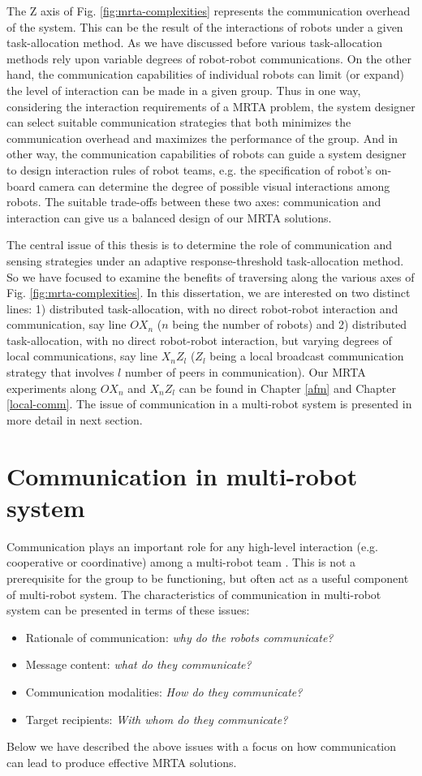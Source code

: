 The Z axis of Fig. \ref{fig:mrta-complexities} represents the communication overhead of the system. This can be the result of the interactions  of robots under a given task-allocation method. As we have discussed before various task-allocation methods rely upon variable degrees of robot-robot communications.  On the other hand, the communication capabilities of individual robots can limit (or expand) the level of interaction can be made  in a given group. Thus in one way, considering the interaction requirements of a MRTA problem, the system designer can  select suitable communication strategies that both minimizes the communication overhead and maximizes the performance of the group. And in other way, the communication capabilities of robots can guide a system designer to design interaction rules of robot teams, e.g. the specification of robot's on-board camera  can determine the degree of possible visual interactions among robots. The suitable trade-offs between these two axes: communication and interaction can give us a balanced design of our MRTA solutions.

The central issue of this thesis is to determine the role of communication and sensing strategies under an adaptive response-threshold task-allocation method. So we have focused to examine the benefits of traversing along the various axes of Fig. \ref{fig:mrta-complexities}. In this dissertation, we are interested on two distinct lines: 1) distributed task-allocation, with no direct robot-robot interaction and communication, say line $OX_{n}$ ($n$ being the number of robots)  and 2) distributed task-allocation, with no direct robot-robot interaction, but varying degrees of local communications, say line $X_{n}Z_{l}$  ($Z_{l}$ being a local broadcast communication strategy that involves $l$ number of peers in communication). Our MRTA experiments along $OX_{n}$ and $X_{n}Z_{l}$ can be found in Chapter \ref{afm} and Chapter \ref{local-comm}. The issue of  communication in a multi-robot system is presented in more detail in next section.
\section{Communication in multi-robot system}
\label{bg:mrs-comm}
Communication plays an important role for any high-level interaction (e.g. cooperative or coordinative) among a multi-robot team \cite{Arkin1998}. This is not a prerequisite for the group to be functioning, but often act as a useful component of multi-robot system. The characteristics of communication in multi-robot system can be presented in terms of these issues:
\begin{itemize}
\item Rationale of communication: {\em why do the robots communicate?} 
\item Message content: {\em what do they communicate?} 
\item Communication modalities: {\em How do they communicate?} 
\item Target recipients: {\em With whom do they communicate?}
\end{itemize}
Below we have described the above issues with a focus on how communication  can lead to produce effective MRTA solutions.
